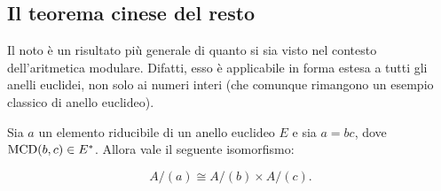 \subsection{Il teorema cinese del resto}

    Il noto  è un risultato più generale di quanto
    si sia visto nel contesto dell'aritmetica modulare. Difatti, esso è
    applicabile in forma estesa a tutti gli anelli euclidei, non solo ai
    numeri interi (che comunque rimangono un esempio classico di anello euclideo). \\
    
    \begin{lemma}
        \label{lem:pre_cinese}

        Sia $a$ un elemento riducibile di un anello euclideo $E$ e
        sia $a=bc$, dove $\operatorname{MCD}(b, c) \in E^*$. Allora vale
        il seguente isomorfismo:
        
        \[ A/(a) \cong A/(b) \times A/(c). \]
    \end{lemma}
    
